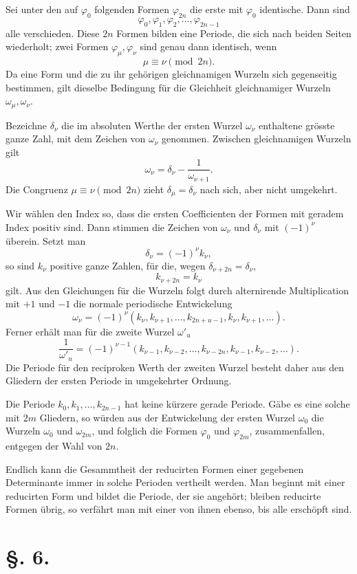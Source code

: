 \documentclass[11pt]{article}
\begin{document}
Sei unter den auf $\varphi_0$ folgenden Formen $\varphi_{2n}$ die erste mit $\varphi_0$ identische. Dann sind
\[
 \varphi_0,\varphi_1,\varphi_2,\ldots,\varphi_{2n-1}
\]
alle verschieden. Diese $2n$ Formen bilden eine Periode, die sich nach beiden Seiten wiederholt; zwei Formen $\varphi_\mu,\varphi_\nu$ sind genau dann identisch, wenn
\[
 \mu\equiv \nu\pmod {2n}.
\]
Da eine Form und die zu ihr gehörigen gleichnamigen Wurzeln sich gegenseitig bestimmen, gilt dieselbe Bedingung für die Gleichheit gleichnamiger Wurzeln $\omega_\mu,\omega_\nu$.

Bezeichne $\delta_\nu$ die im absoluten Werthe der ersten Wurzel $\omega_\nu$ enthaltene grösste ganze Zahl, mit dem Zeichen von $\omega_\nu$ genommen. Zwischen gleichnamigen Wurzeln gilt
\[
 \omega_\nu=\delta_\nu-
\frac1{\omega_{\nu+1}}.
\]
Die Congruenz $\mu\equiv\nu\pmod{2n}$ zieht $\delta_\mu=\delta_\nu$ nach sich, aber nicht umgekehrt.

Wir wählen den Index so, dass die ersten Coefficienten der Formen mit geradem Index positiv sind. Dann stimmen die Zeichen von $\omega_\nu$ und $\delta_\nu$ mit $(-1)^\nu$ überein. Setzt man
\[
 \delta_\nu=(-1)^\nu k_\nu,
\]
so sind $k_\nu$ positive ganze Zahlen, für die, wegen $\delta_{\nu+2n}=\delta_\nu$,
\[
 k_{\nu+2n}=k_\nu
\]
gilt. Aus den Gleichungen für die Wurzeln folgt durch alternirende Multiplication mit $+1$ und $-1$ die normale periodische Entwickelung
\[
 \omega_\nu=(-1)^\nu(k_\nu,k_{\nu+1},\ldots,k_{2n+
u-1},k_\nu,k_{\nu+1},\ldots).
\]
Ferner erhält man für die zweite Wurzel $\omega'_
u$
\[
 \frac1{\omega'_
u}=(-1)^{\nu-1}(k_{\nu-1},k_{\nu-2},\ldots,k_{\nu-2n},k_{\nu-1},k_{\nu-2},\ldots).
\]
Die Periode für den reciproken Werth der zweiten Wurzel besteht daher aus den Gliedern der ersten Periode in umgekehrter Ordnung.

Die Periode $k_0,k_1,
\ldots,k_{2n-1}$ hat keine kürzere gerade Periode. Gäbe es eine solche mit $2m$ Gliedern, so würden aus der Entwickelung der ersten Wurzel $\omega_0$ die Wurzeln $\omega_0$ und $\omega_{2m}$, und folglich die Formen $\varphi_0$ und $\varphi_{2m}$, zusammenfallen, entgegen der Wahl von $2n$.

Endlich kann die Gesammtheit der reducirten Formen einer gegebenen Determinante immer in solche Perioden vertheilt werden. Man beginnt mit einer reducirten Form und bildet die Periode, der sie angehört; bleiben reducirte Formen übrig, so verfährt man mit einer von ihnen ebenso, bis alle erschöpft sind.

\section*{\S. 6.}
\end{document}
